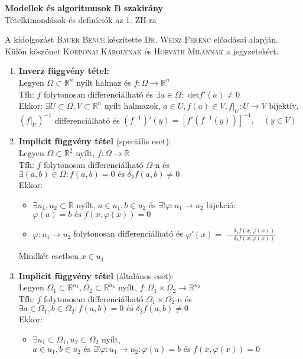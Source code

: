 \documentclass{article}
\begin{document}
\renewcommand{\labelitemi}{\textbullet}
\def\R{\mathbb{R}}
\def\br{\\[0.1cm]}
\def\folytdifh{folytonosan differenciálható }
\begin{center}
	{\Large\textbf{Modellek és algoritmusok B szakirány}}\\[0.2cm]
	Tételkimondások és definíciók az 1. ZH-ra
\end{center}
{\small A kidolgozást \textsc{Bauer Bence} készítette \textsc{Dr. Weisz Ferenc} előadásai alapján.}\\
{\footnotesize Külön köszönet \textsc{Korponai Károlynak} és \textsc{Horváth Milánnak} a jegyzetekért.}

\begin{enumerate}
	\item\textbf{Inverz függvény tétel:}\br
	Legyen $\Omega\subset\R^n$ nyílt halmaz és $f:\Omega\rightarrow\R^n$\br
	Tfh: $f$ \folytdifh és $\exists a\in\Omega:\text{ det}f'(a)\neq0$\br
	Ekkor: $\exists U\subset\Omega, V\subset\R^n$ nyílt halmazok, $a\in U, f(a)\in V,
	f|_U:U\rightarrow V$ bijektív,\br
	$(f|_U)^{-1}$ differenciálható és $(f^{-1})'(y)=[f'(f^{-1}(y))]^{-1},\quad (y\in V)$
	\item\textbf{Implicit függvény tétel} (speciális eset):\br
	Legyen $\Omega\subset\R^2$ nyílt, $f:\Omega\rightarrow\R$\br
	Tfh: $f$ folytonosan differenciálható $\Omega$-n és $\exists(a,b)\in\Omega:
	f(a,b)=0\text{ és }\delta_2f(a,b)\neq0$\br
	Ekkor:
	\begin{itemize}
		\item $\exists u_1, u_2\subset\R$ nyílt, $a\in u_1, b\in u_2\text{ és }\exists!\varphi:
		u_1\rightarrow u_2$ bijekció:$\varphi(a)=b\text{ és }f(x, \varphi(x))=0$
		\item $\varphi:u_1\rightarrow u_2$ \folytdifh és $\varphi'(x)=$
		\LARGE{$-\frac{\delta_1f(x, \varphi(x))}{\delta_2f(x, \varphi(x))}$}
	\end{itemize}
	Mindkét esetben $x\in u_1$
	\item\textbf{Implicit függvény tétel} (általános eset):\br
	Legyen $\Omega_1\subset\R^{n_1},\Omega_2\subset\R^{n_2}$ nyílt, 
	$f:\Omega_1\times\Omega_2\rightarrow\R^{n_2}$\br
	Tfh: $f$ \folytdifh $\Omega_1\times\Omega_2$-n és $\exists a\in\Omega_1, b\in\Omega_2:
	f(a,b)=0\text{ és }\delta_2f(a,b)\neq0$\br
	Ekkor:
	\begin{itemize}
		\item $\exists u_1\subset\Omega_1, u_2\subset\Omega_2$ nyílt, $a\in u_1, b\in u_2\text{ és }\exists!\varphi:
		u_1\rightarrow u_2:\varphi(a)=b\text{ és }f(x, \varphi(x))=0$

\end{itemize}
\end{enumerate}
\end{document}
